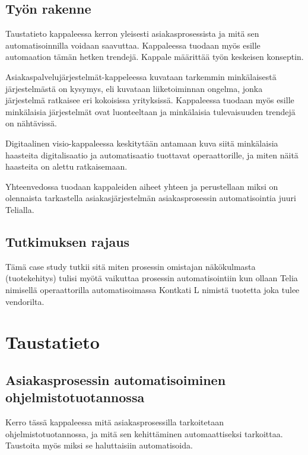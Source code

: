 \documentclass[finnish,12pt,a4paper,pdftex]{article}
\begin{document}
\subsection{Työn rakenne}
Taustatieto kappaleessa kerron yleisesti asiakasprosessista ja mitä sen automatisoinnilla voidaan saavuttaa. Kappaleessa tuodaan myös esille automaation tämän hetken trendejä. Kappale määrittää työn keskeisen konseptin.

Asiakaspalvelujärjestelmät-kappeleessa kuvataan tarkemmin minkälaisestä järjestelmästä on kysymys, eli kuvataan liiketoiminnan ongelma, jonka järjestelmä ratkaisee eri kokoisissa yrityksissä. Kappaleessa tuodaan myös esille minkälaisia järjestelmät ovat luonteeltaan ja minkälaisia tulevaisuuden trendejä on nähtävissä.

Digitaalinen visio-kappaleessa keskitytään antamaan kuva siitä minkälaisia haasteita digitalisaatio ja automatisaatio tuottavat operaattorille, ja miten näitä haasteita on alettu ratkaisemaan.

Yhteenvedossa tuodaan kappaleiden aiheet yhteen ja perustellaan miksi on olennaista tarkastella asiakasjärjestelmän asiakasprosessin automatisointia juuri Telialla.

\subsection{Tutkimuksen rajaus}

Tämä case study tutkii sitä miten prosessin omistajan näkökulmasta (tuotekehitys) tulisi myötä vaikuttaa prosessin automatisointiin kun ollaan Telia nimisellä operaattorilla automatisoimassa Kontkati L nimistä tuotetta joka tulee vendorilta.

\clearpage

\section{Taustatieto}



\subsection{Asiakasprosessin automatisoiminen ohjelmistotuotannossa}
Kerro tässä kappaleessa mitä asiakasprosessilla tarkoitetaan ohjelmistotuotannossa, ja mitä sen kehittäminen automaattiseksi tarkoittaa. Taustoita myös miksi se haluttaisiin automatisoida. \\
 
\end{document}
